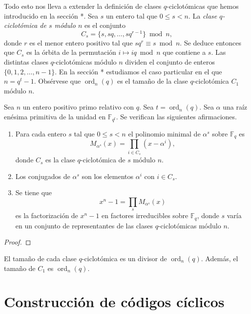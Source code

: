 Todo esto nos lleva a extender la definición de clases \(q\)-ciclotómicas que hemos introducido en la sección *.
Sea \(s\) un entero tal que \(0 \leq s < n\).
La \textit{clase \(q\)-ciclotómica de \(s\) módulo \(n\)} es el conjunto
\[
  C_s = \{s, sq, \dots, sq^{r-1}\} \bmod n, 
\]
donde \(r\) es el menor entero positivo tal que \(sq^r \equiv s \bmod n\).
Se deduce entonces que \(C_s\) es la órbita de la permutación \(i \mapsto iq \bmod n\) que contiene a \(s\).
Las distintas clases \(q\)-ciclotómicas módulo \(n\) dividen el conjunto de enteros \(\{0, 1, 2, \dots, n - 1\}\).
En la sección * estudiamos el caso particular en el que \(n = q^t - 1\).
Obsérvese que \(\operatorname{ord}_n(q)\) es el tamaño de la clase \(q\)-ciclotómica \(C_1\) módulo \(n\).

\begin{theorem}
  Sea \(n\) un entero positivo primo relativo con \(q\).
  Sea \(t = \operatorname{ord}_n(q)\).
  Sea \(\alpha\) una raíz enésima primitiva de la unidad en \(\mathbb F_{q^t}\).
  Se verifican las siguientes afirmaciones.
  \begin{enumerate}
    \item Para cada entero \(s\) tal que \(0 \leq s < n\) el polinomio minimal de \(\alpha^s\) sobre \(\mathbb F_q\) es
    \[
      M_{\alpha^s}(x) = \prod_{i \in C_s}(x - \alpha^i),
    \]
    donde \(C_s\) es la clase \(q\)-ciclotómica de \(s\) módulo \(n\).
    \item Los conjugados de \(\alpha^s\) son los elementos \(\alpha^i\) con \(i \in C_s\).
    \item Se tiene que
    \[
      x^n - 1 = \prod_s M_{\alpha^s}(x)
    \]
    es la factorización de \(x^n - 1\) en factores irreducibles sobre \(\mathbb F_q\), donde \(s\) varía en un conjunto de representantes de las clases \(q\)-ciclotómicas módulo \(n\).
  \end{enumerate}
\end{theorem}

\begin{proof}
\end{proof}

\begin{theorem}
  El tamaño de cada clase \(q\)-ciclotómica es un divisor de \(\operatorname{ord}_n(q)\).
  Además, el tamaño de \(C_1\) es \(\operatorname{ord}_n(q)\).
\end{theorem}

\section{Construcción de códigos cíclicos}

